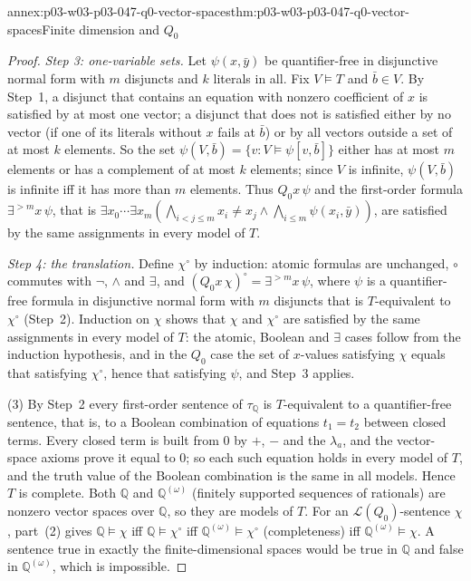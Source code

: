 \begin{annexitem}{annex:p03-w03-p03-047-q0-vector-spaces}{thm:p03-w03-p03-047-q0-vector-spaces}{Finite dimension and \(Q_0\)}
\begin{proof}
\emph{Step 3: one-variable sets.}  Let \(\psi(x,\bar y)\) be quantifier-free
in disjunctive normal form with \(m\) disjuncts and \(k\) literals in all.
Fix \(V\models T\) and \(\bar b\in V\).  By Step~1, a disjunct that contains
an equation with nonzero coefficient of \(x\) is satisfied by at most one
vector; a disjunct that does not is satisfied either by no vector (if one of
its literals without \(x\) fails at \(\bar b\)) or by all vectors outside a
set of at most \(k\) elements.  So the set
\(\psi(V,\bar b)=\{v:V\models\psi[v,\bar b]\}\) either has at most \(m\)
elements or has a complement of at most \(k\) elements; since \(V\) is
infinite, \(\psi(V,\bar b)\) is infinite iff it has more than \(m\)
elements.  Thus \(Q_0x\,\psi\) and the first-order formula
\(\exists^{>m}x\,\psi\), that is
\(\exists x_0\cdots\exists x_m(\bigwedge_{i<j\le m}x_i\ne x_j\land\bigwedge_{i\le m}\psi(x_i,\bar y))\),
are satisfied by the same assignments in every model of \(T\).

\emph{Step 4: the translation.}  Define \(\chi^\circ\) by induction:
atomic formulas are unchanged, \(\circ\) commutes with \(\neg\), \(\land\)
and \(\exists\), and \((Q_0x\,\chi)^\circ=\exists^{>m}x\,\psi\), where
\(\psi\) is a quantifier-free formula in disjunctive normal form with \(m\)
disjuncts that is \(T\)-equivalent to \(\chi^\circ\) (Step~2).  Induction on
\(\chi\) shows that \(\chi\) and \(\chi^\circ\) are satisfied by the same
assignments in every model of \(T\): the atomic, Boolean and \(\exists\)
cases follow from the induction hypothesis, and in the \(Q_0\) case the set
of \(x\)-values satisfying \(\chi\) equals that satisfying \(\chi^\circ\),
hence that satisfying \(\psi\), and Step~3 applies.

(3) By Step~2 every first-order sentence of \(\tau_{\mathbb Q}\) is
\(T\)-equivalent to a quantifier-free sentence, that is, to a Boolean
combination of equations \(t_1=t_2\) between closed terms.  Every closed
term is built from \(0\) by \(+\), \(-\) and the \(\lambda_a\), and the
vector-space axioms prove it equal to \(0\); so each such equation holds in
every model of \(T\), and the truth value of the Boolean combination is the
same in all models.  Hence \(T\) is complete.  Both \(\mathbb Q\) and
\(\mathbb Q^{(\omega)}\) (finitely supported sequences of rationals) are
nonzero vector spaces over \(\mathbb Q\), so they are models of \(T\).  For an
\(\mathscr L(Q_0)\)-sentence \(\chi\), part~(2) gives
\(\mathbb Q\models\chi\) iff \(\mathbb Q\models\chi^\circ\) iff
\(\mathbb Q^{(\omega)}\models\chi^\circ\) (completeness) iff
\(\mathbb Q^{(\omega)}\models\chi\).  A sentence true in exactly the
finite-dimensional spaces would be true in \(\mathbb Q\) and false in
\(\mathbb Q^{(\omega)}\), which is impossible.
\end{proof}
\end{annexitem}

